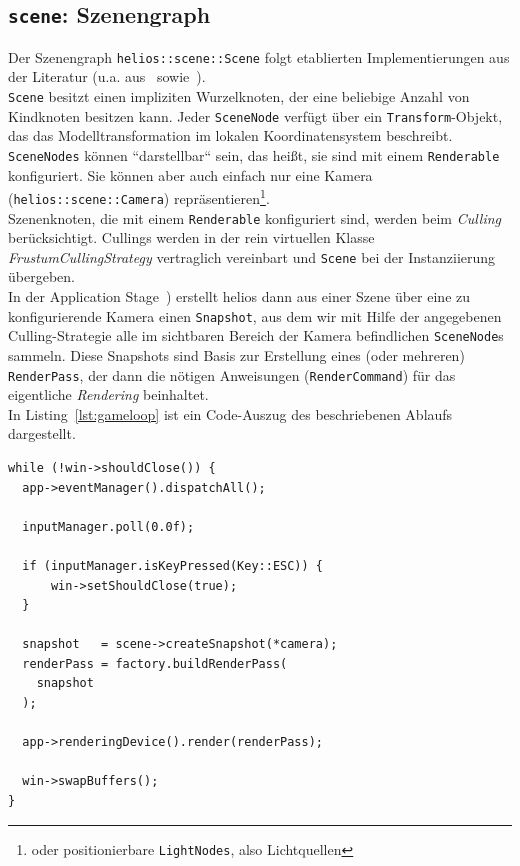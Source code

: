 \subsection*{\texttt{scene}: Szenengraph}
Der Szenengraph \texttt{helios::scene::Scene} folgt etablierten Implementierungen aus der Literatur  (u.a. aus~\cite[]{She07} sowie~\cite[]{Gre19}).\\
\texttt{Scene} besitzt einen impliziten Wurzelknoten, der eine beliebige Anzahl von Kindknoten besitzen kann.
Jeder \texttt{SceneNode} verfügt über ein \texttt{Transform}-Objekt, das das Modelltransformation im lokalen Koordinatensystem beschreibt.\\
\texttt{SceneNodes} können ``darstellbar`` sein, das heißt, sie sind mit einem \texttt{Renderable} konfiguriert.
Sie können aber auch einfach nur eine Kamera (\texttt{helios::scene::Camera}) repräsentieren\footnote{oder positionierbare \texttt{LightNodes}, also Lichtquellen}.\\
Szenenknoten, die mit einem \texttt{Renderable} konfiguriert sind, werden beim \textit{Culling} berücksichtigt.
Cullings werden in der rein virtuellen Klasse \textit{FrustumCullingStrategy} vertraglich vereinbart und \texttt{Scene} bei der Instanziierung übergeben.\\
In der Application Stage~\cite[687]{Gre19}) erstellt helios dann aus einer Szene über eine zu konfigurierende Kamera einen \texttt{Snapshot}, aus dem wir mit Hilfe der angegebenen Culling-Strategie alle im sichtbaren Bereich der Kamera befindlichen \texttt{SceneNode}s sammeln.
Diese Snapshots sind Basis zur Erstellung eines (oder mehreren) \texttt{RenderPass}, der dann die nötigen Anweisungen (\texttt{RenderCommand}) für das eigentliche \textit{Rendering} beinhaltet.\\
In Listing~\ref{lst:gameloop} ist ein Code-Auszug des beschriebenen Ablaufs dargestellt.

\vspace{4mm}
\begin{lstlisting}[style=c++style, caption={Game Loop in helios.}, label=lst:gameloop]
while (!win->shouldClose()) {
  app->eventManager().dispatchAll();

  inputManager.poll(0.0f);

  if (inputManager.isKeyPressed(Key::ESC)) {
      win->setShouldClose(true);
  }

  snapshot   = scene->createSnapshot(*camera);
  renderPass = factory.buildRenderPass(
    snapshot
  );

  app->renderingDevice().render(renderPass);

  win->swapBuffers();
}
\end{lstlisting}
\vspace{4mm}


